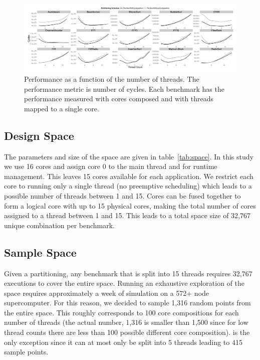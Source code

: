 \begin{figure}[t]
 \centering
    \includegraphics[width=1\textwidth]{streamit-paper/graphics/threadingmaybe.pdf}
    \caption{Performance as a function of the number of threads. The performance metric is number of cycles. Each benchmark has the performance measured with cores composed and with threads mapped to a single core.}\label{fig:threadtrend}
\end{figure}


\subsection{Design Space}

The parameters and size of the space are given in table~\ref{tab:space}.
In this study we use 16 cores and assign core 0 to the main thread and for runtime management. This leaves 15 cores available for each application.
We restrict each core to running only a single thread (no preemptive scheduling) which leads to a possible number of threads between 1 and 15.
Cores can be fused together to form a logical core with up to 15 physical cores, making the total number of cores assigned to a thread between 1 and 15.
This leads to a total space size of 32,767 unique combination per benchmark.

\subsection{Sample Space}

Given a partitioning, any benchmark that is split into 15 threads requires 32,767 executions to cover the entire space.
Running an exhaustive exploration of the space requires approximately a week of simulation on a 572+ node supercomputer.
For this reason, we decided to sample 1,316 random points from the entire space.
This roughly corresponds to 100 core compositions for each number of threads (the actual number, 1,316 is smaller than 1,500 since for low thread counts there are less than 100 possible different core composition).
 is the only exception since it can at most only be split into 5 threads leading to 415 sample points.


